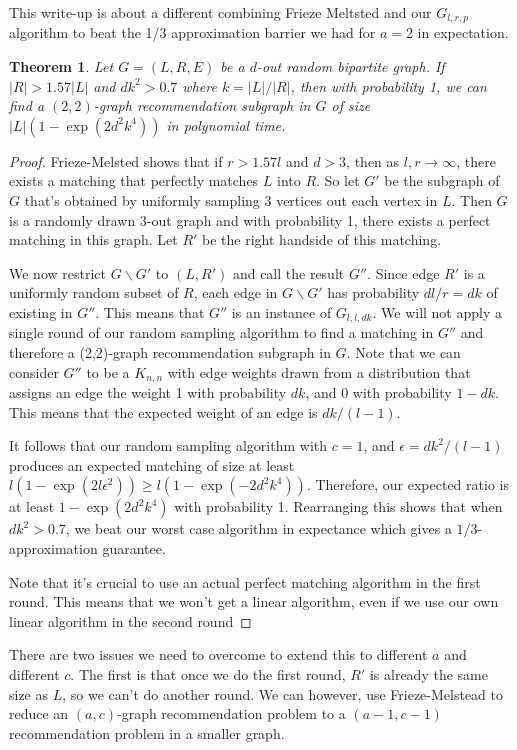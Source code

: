 \documentclass[]{letter}
\newtheorem{thm}{Theorem}
\begin{document}
This write-up is about a different combining Frieze Meltsted and our $G_{l,r,p}$ algorithm to beat the 1/3 approximation barrier we had for $a=2$ in expectation. 

\begin{thm}
Let $G=(L,R,E)$ be a $d$-out random bipartite graph. If $|R| > 1.57|L|$ and $dk^2 > 0.7$ where $k = |L|/|R|$, then with probability 1, we can find a $(2,2)$-graph recommendation subgraph in $G$ of size $|L|(1-\exp(2d^2k^4))$ in polynomial time.
\end{thm}

\begin{proof}
Frieze-Melsted shows that if $r > 1.57l$ and $d>3$, then as $l,r \to \infty$, there exists a matching that perfectly matches $L$ into $R$. So let $G'$ be the subgraph of $G$ that's obtained by uniformly sampling $3$ vertices out each vertex in $L$. Then $G$ is a randomly drawn 3-out graph and with probability 1, there exists a perfect matching in this graph. Let $R'$ be the right handside of this matching.

We now restrict $G\backslash G'$ to $(L,R')$ and call the result $G''$. Since edge $R'$ is a uniformly random subset of $R$, each edge in $G\backslash G'$ has probability $dl/r = dk$ of existing in $G''$. This means that $G''$ is an instance of $G_{l,l,dk}$. We will not apply a single round of our random sampling algorithm to find a matching in $G''$ and therefore a (2,2)-graph recommendation subgraph in $G$. Note that we can consider $G''$ to be a $K_{n,n}$ with edge weights drawn from a distribution that assigns an edge the weight 1 with probability $dk$, and 0 with probability $1-dk$. This means that the expected weight of an edge is $dk/(l-1)$. 

It follows that our random sampling algorithm with $c=1$, and $\epsilon = dk^2/(l-1)$ produces an expected matching of size at least $l(1-\exp(2l\epsilon^2)) \geq l(1-\exp(-2d^2k^4))$. Therefore, our expected ratio is at least $1-\exp(2d^2k^4)$ with probability 1. Rearranging this shows that when $dk^2 > 0.7$, we beat our worst case algorithm in expectance which gives a $1/3$-approximation guarantee.

Note that it's crucial to use an actual perfect matching algorithm in the first round. This means that we won't get a linear algorithm, even if we use our own linear algorithm in the second round
\end{proof}

There are two issues we need to overcome to extend this to different $a$ and different $c$. The first is that once we do the first round, $R'$ is already the same size as $L$, so we can't do another round. We can however, use Frieze-Melstead to reduce an $(a,c)$-graph recommendation problem to a $(a-1,c-1)$ recommendation problem in a smaller graph.
\end{document}
